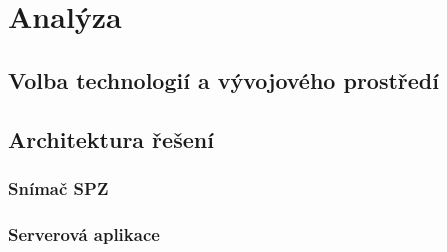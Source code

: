 
\chapter{Analýza} \label{analyza}

\section{Volba technologií a vývojového prostředí} \label{devenv}





\section{Architektura řešení} \label{architektura_reseni}


\subsection{Snímač SPZ}


\subsection{Serverová aplikace}



